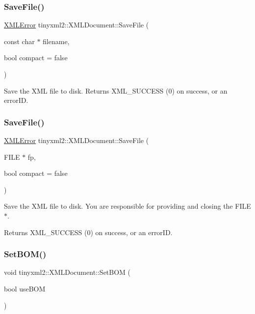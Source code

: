 \subsubsection{\texorpdfstring{Save\+File()}{SaveFile()}\hspace{0.1cm}{\footnotesize\ttfamily [1/2]}}
{\footnotesize\ttfamily \hyperlink{namespacetinyxml2_a1fbf88509c3ac88c09117b1947414e08}{X\+M\+L\+Error} tinyxml2\+::\+X\+M\+L\+Document\+::\+Save\+File (\begin{DoxyParamCaption}\item[{const char $\ast$}]{filename,  }\item[{bool}]{compact = {\ttfamily false} }\end{DoxyParamCaption})}

Save the X\+ML file to disk. Returns X\+M\+L\+\_\+\+S\+U\+C\+C\+E\+SS (0) on success, or an error\+ID. \mbox{\label{classtinyxml2_1_1_x_m_l_document_a8b95779479a0035acc67b3a61dfe1b74}} 
\subsubsection{\texorpdfstring{Save\+File()}{SaveFile()}\hspace{0.1cm}{\footnotesize\ttfamily [2/2]}}
{\footnotesize\ttfamily \hyperlink{namespacetinyxml2_a1fbf88509c3ac88c09117b1947414e08}{X\+M\+L\+Error} tinyxml2\+::\+X\+M\+L\+Document\+::\+Save\+File (\begin{DoxyParamCaption}\item[{F\+I\+LE $\ast$}]{fp,  }\item[{bool}]{compact = {\ttfamily false} }\end{DoxyParamCaption})}

Save the X\+ML file to disk. You are responsible for providing and closing the F\+I\+L\+E$\ast$.

Returns X\+M\+L\+\_\+\+S\+U\+C\+C\+E\+SS (0) on success, or an error\+ID. \mbox{\label{classtinyxml2_1_1_x_m_l_document_a14419b698f7c4b140df4e80f3f0c93b0}} 
\subsubsection{\texorpdfstring{Set\+B\+O\+M()}{SetBOM()}}
{\footnotesize\ttfamily void tinyxml2\+::\+X\+M\+L\+Document\+::\+Set\+B\+OM (\begin{DoxyParamCaption}\item[{bool}]{use\+B\+OM }\end{DoxyParamCaption})\hspace{0.3cm}{\ttfamily [inline]}}

